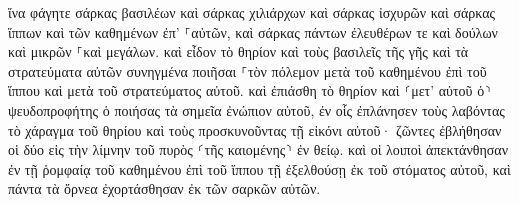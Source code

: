 \documentclass{openreader}
\begin{document}
ἵνα φάγητε σάρκας βασιλέων καὶ σάρκας χιλιάρχων καὶ σάρκας ἰσχυρῶν καὶ σάρκας ἵππων καὶ τῶν καθημένων ἐπ’ ⸀αὐτῶν, καὶ σάρκας πάντων ἐλευθέρων τε καὶ δούλων καὶ μικρῶν ⸀καὶ μεγάλων. 
καὶ εἶδον τὸ θηρίον καὶ τοὺς βασιλεῖς τῆς γῆς καὶ τὰ στρατεύματα αὐτῶν συνηγμένα ποιῆσαι ⸀τὸν πόλεμον μετὰ τοῦ καθημένου ἐπὶ τοῦ ἵππου καὶ μετὰ τοῦ στρατεύματος αὐτοῦ. 
καὶ ἐπιάσθη τὸ θηρίον καὶ ⸂μετ’ αὐτοῦ ὁ⸃ ψευδοπροφήτης ὁ ποιήσας τὰ σημεῖα ἐνώπιον αὐτοῦ, ἐν οἷς ἐπλάνησεν τοὺς λαβόντας τὸ χάραγμα τοῦ θηρίου καὶ τοὺς προσκυνοῦντας τῇ εἰκόνι αὐτοῦ· ζῶντες ἐβλήθησαν οἱ δύο εἰς τὴν λίμνην τοῦ πυρὸς ⸂τῆς καιομένης⸃ ἐν θείῳ. 
καὶ οἱ λοιποὶ ἀπεκτάνθησαν ἐν τῇ ῥομφαίᾳ τοῦ καθημένου ἐπὶ τοῦ ἵππου τῇ ἐξελθούσῃ ἐκ τοῦ στόματος αὐτοῦ, καὶ πάντα τὰ ὄρνεα ἐχορτάσθησαν ἐκ τῶν σαρκῶν αὐτῶν. 
\end{document}
